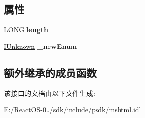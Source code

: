 \subsection*{属性}
\begin{DoxyCompactItemize}
\item 
\mbox{\label{interface_m_s_h_t_m_l_1_1_i_h_t_m_l_element_collection_aa5550df6f8fa5492d2110ca57890d4d7}} 
L\+O\+NG {\bfseries length}
\item 
\mbox{\label{interface_m_s_h_t_m_l_1_1_i_h_t_m_l_element_collection_af48a46dd3390f074ea3b05fc3fd55f09}} 
\hyperlink{interface_i_unknown}{I\+Unknown} {\bfseries \+\_\+new\+Enum}
\end{DoxyCompactItemize}
\subsection*{额外继承的成员函数}


该接口的文档由以下文件生成\+:\begin{DoxyCompactItemize}
\item 
E\+:/\+React\+O\+S-\/0../sdk/include/psdk/mshtml.\+idl\end{DoxyCompactItemize}
